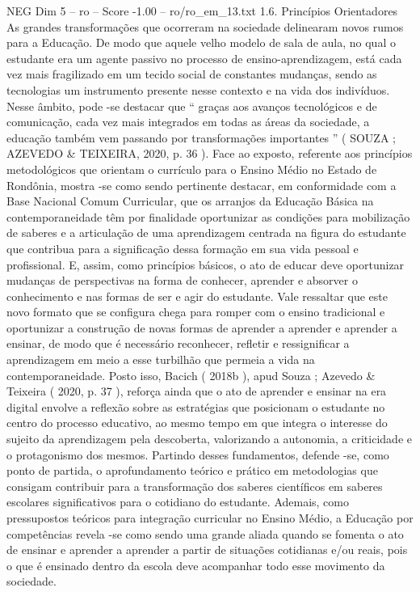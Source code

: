 \begin{textsample}{NEG Dim 5 – ro – Score -1.00 – ro/ro\_em\_13.txt}  \label{ex:f5_neg_172}
1.6.
Princípios Orientadores As grandes transformações que ocorreram na sociedade delinearam novos rumos para a Educação.
De modo que aquele velho modelo de sala de aula, no qual o estudante era um agente passivo no processo de ensino-aprendizagem, está cada vez mais fragilizado em um tecido social de constantes mudanças, sendo as tecnologias um instrumento presente nesse contexto e na vida dos indivíduos.
Nesse âmbito, pode -se destacar que “ graças aos avanços tecnológicos e de comunicação, cada vez mais integrados em todas as áreas da sociedade, a educação também vem passando por transformações importantes ” ( SOUZA ; AZEVEDO \& TEIXEIRA, 2020, p. 36 ).
Face ao exposto, referente aos princípios metodológicos que orientam o currículo para o Ensino Médio no Estado de Rondônia, mostra -se como sendo pertinente destacar, em conformidade com a Base Nacional Comum Curricular, que os arranjos da Educação Básica na contemporaneidade têm por finalidade oportunizar as condições para mobilização de saberes e a articulação de uma aprendizagem centrada na figura do estudante que contribua para a significação dessa formação em sua vida pessoal e profissional.
E, assim, como princípios básicos, o ato de educar deve oportunizar mudanças de perspectivas na forma de conhecer, aprender e absorver o conhecimento e nas formas de ser e agir do estudante.
Vale ressaltar que este novo formato que se configura chega para romper com o ensino tradicional e oportunizar a construção de novas formas de aprender a aprender e aprender a ensinar, de modo que é necessário reconhecer, refletir e ressignificar a aprendizagem em meio a esse turbilhão que permeia a vida na contemporaneidade.
Posto isso, Bacich ( 2018b ), apud Souza ; Azevedo \& Teixeira ( 2020, p. 37 ), reforça ainda que o ato de aprender e ensinar na era digital envolve a reflexão sobre as estratégias que posicionam o estudante no centro do processo educativo, ao mesmo tempo em que integra o interesse do sujeito da aprendizagem pela descoberta, valorizando a autonomia, a criticidade e o protagonismo dos mesmos.
Partindo desses fundamentos, defende -se, como ponto de partida, o aprofundamento teórico e prático em metodologias que consigam contribuir para a transformação dos saberes científicos em saberes escolares significativos para o cotidiano do estudante.
Ademais, como pressupostos teóricos para integração curricular no Ensino Médio, a Educação por competências revela -se como sendo uma grande aliada quando se fomenta o ato de ensinar e aprender a aprender a partir de situações cotidianas e/ou reais, pois o que é ensinado dentro da escola deve acompanhar todo esse movimento da sociedade.

\end{textsample}
